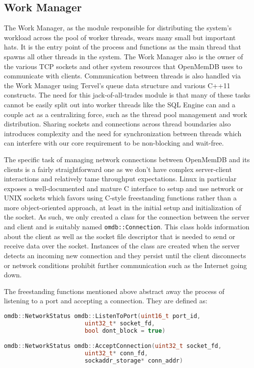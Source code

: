 \documentclass[letterpaper, 12pt]{article}
\begin{document}
  \subsection{Work Manager}
  The Work Manager, as the module responsible for distributing the system's workload across the
  pool of worker threads, wears many small but important hats. It is the entry point of the
  process and functions as the main thread that spawns all other threads in the system. The Work
  Manager also is the owner of the various TCP sockets and other system resources that OpenMemDB
  uses to communicate with clients. Communication between threads is also handled via the
  Work Manager using Tervel's queue data structure and various C++11 constructs. The need for this
  jack-of-all-trades module is that many of these tasks cannot be easily split out into
  worker threads like the SQL Engine can and a couple act as a centralizing force, such as the
  thread pool management and work distribution. Sharing sockets and connections across thread
  boundaries also introduces complexity and the need for synchronization between threads which
  can interfere with our core requirement to be non-blocking and wait-free.
  \par\vspace{\baselineskip}
  The specific task of managing network connections between OpenMemDB and its clients is a fairly
  straightforward one as we don't have complex server-client interactions and relatively tame
  throughput expectations. Linux in particular exposes a well-documented and mature C interface
  to setup and use network or UNIX sockets which favors using C-style freestanding functions
  rather than a more object-oriented approach, at least in the initial setup and initialization
  of the socket. As such, we only created a class for the connection between the server and client
  and is suitably named \lstinline[basicstyle=\ttfamily]|omdb::Connection|. This class holds
  information about the client as well as the socket file descriptor that is needed to send
  or receive data over the socket. Instances of the class are created when the server detects an
  incoming new connection and they persist until the client disconnects or network conditions
  prohibit further communication such as the Internet going down.
  \par\vspace{\baselineskip}
  The freestanding functions mentioned above abstract away the process of listening to a port
  and accepting a connection. They are defined as:
  \begin{lstlisting}[language=C++]
omdb::NetworkStatus omdb::ListenToPort(uint16_t port_id,
				       uint32_t* socket_fd,
				       bool dont_block = true)

omdb::NetworkStatus omdb::AcceptConnection(uint32_t socket_fd,
					   uint32_t* conn_fd,
					   sockaddr_storage* conn_addr)
  \end{lstlisting}
\end{document}
